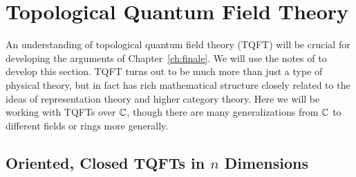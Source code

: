 	
	
	
	\section{Topological Quantum Field Theory} %
	\label{sec:topological_quantum_field_theory}
	
	An understanding of topological quantum field theory (TQFT) will be crucial for developing the arguments of Chapter~\ref{ch:finale}. We will use the notes of \cite{carqueville2017} to develop this section. TQFT turns out to be much more than just a type of physical theory, but in fact has rich mathematical structure closely related to the ideas of representation theory and higher category theory. Here we will be working with TQFTs over $\mathbb{C}$, though there are many generalizations from $\mathbb{C}$ to different fields or rings more generally.
	
	\subsection{Oriented, Closed TQFTs in $n$ Dimensions} %
	\label{sub:oriented_closed_tqfts_in_n_dimensions}
	
